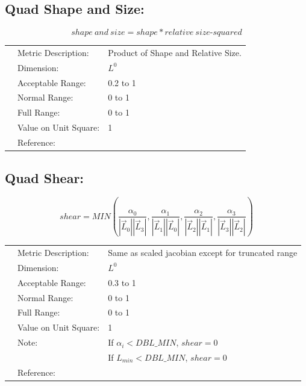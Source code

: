 \documentclass[12pt]{article}
\begin{document}
\subsection*{Quad Shape and Size:}

\begin{displaymath}
shape~and~size = shape * relative~size \textrm{-}squared 
\end{displaymath}

\begin{tabular}{lll}
& Metric Description:  & Product of Shape and Relative Size.\\ 
& Dimension:           & $L^0$       \\ 
& Acceptable Range:    & 0.2 to 1 \\ 
& Normal Range:        & 0 to 1\\ 
& Full Range:          & 0 to 1\\ 
& Value on Unit Square:& 1 \\
& Reference:           & \cite{four} \\
\end{tabular} 



\subsection*{Quad Shear:}

\begin{displaymath}
shear = MIN \left( \frac {\alpha_0} {|\vec L_0| |\vec L_3|}, 
                             \frac {\alpha_1} {|\vec L_1| |\vec L_0|},
                             \frac {\alpha_2} {|\vec L_2| |\vec L_1|},
                             \frac {\alpha_3} {|\vec L_3| |\vec L_2|} \right)
\end{displaymath}

\begin{tabular}{lll}
& Metric Description:  & Same as scaled jacobian except for truncated range \\
& Dimension:           & $L^0$  \\ 
& Acceptable Range:    & 0.3 to 1 \\ 
& Normal Range:        & 0 to 1\\ 
& Full Range:          & 0 to 1\\ 
& Value on Unit Square:& 1 \\
& Note:                & If $\alpha_i < DBL\_MIN$, $shear = 0$ \\
&                      & If $L_{min} < DBL\_MIN$, $shear = 0$ \\
& Reference:           &  \cite{four} \\
\end{tabular} 
\end{document}
